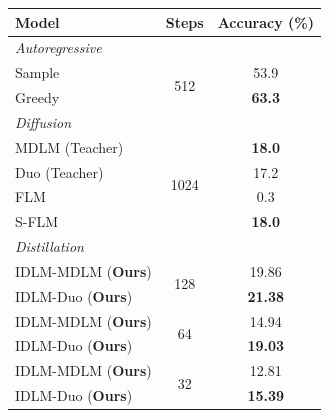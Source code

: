 \par\noindent
\begin{minipage}{\columnwidth}
\vspace{-1mm}
\captionsetup{type=table}
\centering
{}
\label{tab:tinygsm}
\scriptsize
\setlength{\tabcolsep}{5pt}
\renewcommand{\arraystretch}{0.94}
\begin{tabular}{lcc}
\toprule
Model & Steps & Accuracy (\%) \\
\midrule
\multicolumn{3}{l}{\textit{Autoregressive}} \\
Sample & \multirow{2}{*}{512} & 53.9 \\
Greedy & & \textbf{63.3} \\
\midrule
\multicolumn{3}{l}{\textit{Diffusion}} \\
MDLM (Teacher)~\citep{sahoo2024simple} & \multirow{4}{*}{1024} & \textbf{18.0} \\
Duo (Teacher)~\citep{sahoo2025the} & & 17.2 \\
FLM~\citep{lee2026flow} & & 0.3 \\
S-FLM~\citep{deschenaux2026language} & & \textbf{18.0} \\
\midrule
\multicolumn{3}{l}{\textit{Distillation}} \\
IDLM-MDLM (\textbf{Ours}) & \multirow{2}{*}{128} & 19.86 \\
IDLM-Duo (\textbf{Ours}) & & \textbf{21.38} \\
\midrule
IDLM-MDLM (\textbf{Ours}) & \multirow{2}{*}{64} & 14.94 \\
IDLM-Duo (\textbf{Ours}) & & \textbf{19.03} \\
\midrule
IDLM-MDLM (\textbf{Ours}) & \multirow{2}{*}{32} & 12.81 \\
IDLM-Duo (\textbf{Ours}) & & \textbf{15.39} \\
\bottomrule
\end{tabular}
\vspace{-1mm}
\end{minipage}
\par
